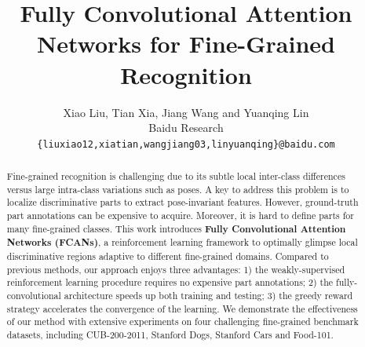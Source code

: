 \documentclass[10pt,twocolumn,letterpaper]{article}
\begin{document}
\title{Fully Convolutional Attention Networks for Fine-Grained Recognition}

\author{Xiao Liu, Tian Xia, Jiang Wang and Yuanqing Lin\\
Baidu Research\\
{\tt\small \{liuxiao12,xiatian,wangjiang03,linyuanqing\}@baidu.com}
}

\maketitle

\begin{abstract}
Fine-grained recognition is challenging due to its subtle local inter-class differences versus large intra-class variations such as poses.
A key to address this problem is to localize discriminative parts to extract pose-invariant features.
However, ground-truth part annotations can be expensive to acquire.
Moreover, it is hard to define parts for many fine-grained classes.
This work introduces \textbf{Fully Convolutional Attention Networks (FCANs)}, a reinforcement learning framework to optimally glimpse local discriminative regions adaptive to different fine-grained domains.
Compared to previous methods, our approach enjoys three advantages:
1) the weakly-supervised reinforcement learning procedure requires no expensive part annotations;
2) the fully-convolutional architecture speeds up both training and testing;
3) the greedy reward strategy accelerates the convergence of the learning.
We demonstrate the effectiveness of our method with extensive experiments on four challenging fine-grained benchmark datasets, including CUB-200-2011, Stanford Dogs, Stanford Cars and Food-101.
\end{abstract}
\end{document}

